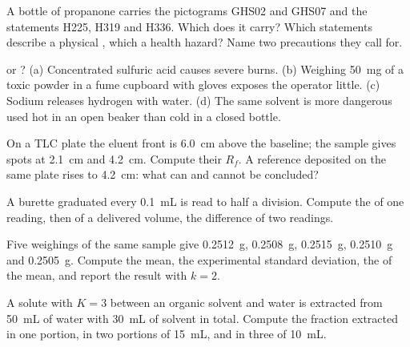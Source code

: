 \begin{exercise}[$\star$]\label{exo:b1:lab-techniques-1:1}
A bottle of propanone carries the pictograms GHS02 and GHS07 and the
statements H225, H319 and H336. Which  does it carry? Which
statements describe a physical , which a health hazard? Name two
precautions they call for.
\end{exercise}

\begin{exercise}[$\star$]\label{exo:b1:lab-techniques-1:2}
 or ? (a) Concentrated sulfuric acid causes severe burns.
(b) Weighing \qty{50}{mg} of a toxic powder in a fume cupboard with
gloves exposes the operator little. (c) Sodium releases hydrogen with
water. (d) The same solvent is more dangerous used hot in an open beaker
than cold in a closed bottle.
\end{exercise}

\begin{exercise}[$\star$]\label{exo:b1:lab-techniques-1:3}
On a TLC plate the eluent front is \qty{6.0}{cm} above the baseline;
the sample gives spots at \qty{2.1}{cm} and \qty{4.2}{cm}. Compute their
$R_f$. A reference deposited on the same plate rises to \qty{4.2}{cm}:
what can and cannot be concluded?
\end{exercise}

\begin{exercise}[$\star$]\label{exo:b1:lab-techniques-1:4}
A burette graduated every \qty{0.1}{mL} is read to half a division.
Compute the  of one reading, then of a delivered
volume, the difference of two readings.
\end{exercise}

\begin{exercise}[$\star\star$]\label{exo:b1:lab-techniques-1:5}
Five weighings of the same sample give \qty{0.2512}{g}, \qty{0.2508}{g},
\qty{0.2515}{g}, \qty{0.2510}{g} and \qty{0.2505}{g}. Compute the mean,
the experimental standard deviation, the  of the mean,
and report the result with $k = 2$.
\end{exercise}

\begin{exercise}[$\star\star$]\label{exo:b1:lab-techniques-1:6}
A solute with  $K = 3$ between an organic solvent and
water is extracted from \qty{50}{mL} of water with \qty{30}{mL} of solvent
in total. Compute the fraction extracted in one portion, in two portions
of \qty{15}{mL}, and in three of \qty{10}{mL}.
\end{exercise}

